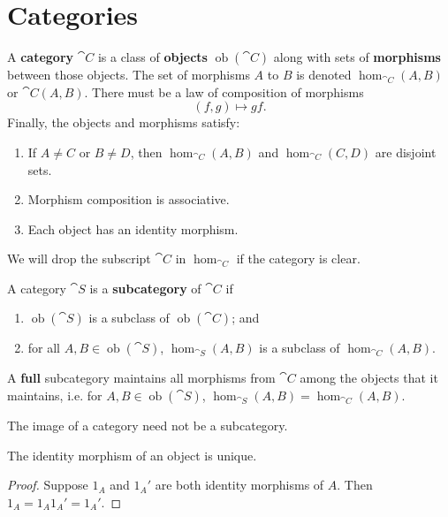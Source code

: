 \documentclass[twoside,10pt]{report}
\DeclareMathOperator{\ob}{ob}
\begin{document}
\tableofcontents


\section{Categories}

\begin{defn}
	A \textbf{category} $\cat{C}$ is a class of \textbf{objects} $\ob(\cat{C})$ along with sets of \textbf{morphisms} between those objects. The set of morphisms $A$ to $B$ is denoted $\hom_{\cat{C}}(A,B)$ or $\cat{C}(A,B)$. There must be a law of composition of morphisms
	\[
		(f, g) \mapsto gf.
	\] Finally, the objects and morphisms satisfy:
	\begin{enumerate}
		\item If $A \neq C$ or $B \neq D$, then $\hom_{\cat{C}}(A,B)$ and $\hom_{\cat{C}}(C,D)$ are disjoint sets.
		\item Morphism composition is associative.
		\item Each object has an identity morphism.
	\end{enumerate}
\end{defn}

We will drop the subscript $\cat{C}$ in $\hom_{\cat{C}}$ if the category is clear.

\begin{defn}
	A category $\cat{S}$ is a \textbf{subcategory} of $\cat{C}$ if
	\begin{enumerate}
		\item $\ob(\cat{S})$ is a subclass of $\ob(\cat{C})$; and
		\item for all $A, B \in \ob(\cat{S})$, $\hom_{\cat{S}}(A,B)$ is a subclass of $\hom_{\cat{C}}(A,B)$.
	\end{enumerate}
	A \textbf{full} subcategory maintains all morphisms from $\cat{C}$ among the objects that it maintains, i.e. for $A, B \in \ob(\cat{S})$, $\hom_{\cat{S}}(A,B) = \hom_{\cat{C}}(A,B)$.
\end{defn}

\begin{note}
The image of a category need not be a subcategory.
\end{note}

\begin{prop}
The identity morphism of an object is unique.
\end{prop}
\begin{proof}
	Suppose $1_{A}$ and $1_{A}'$ are both identity morphisms of $A$. Then $1_{A}=1_{A}1_{A}'=1_{A}'$.
\end{proof}
\end{document}
